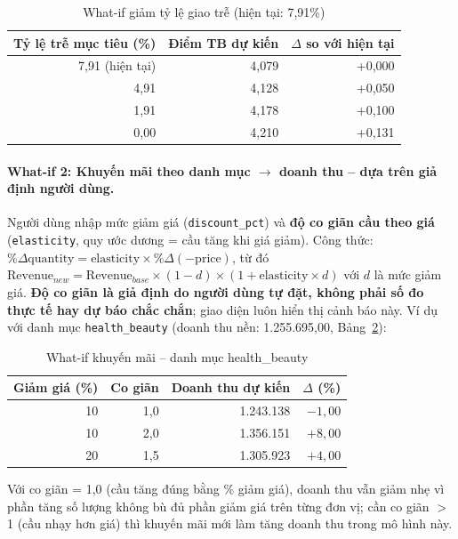 \documentclass[12pt,a4paper]{article}
\newcommand{\code}[1]{\texttt{\small #1}}
\begin{document}
\begin{table}[h]
\centering
\caption{What-if giảm tỷ lệ giao trễ (hiện tại: 7,91\%)}\label{tab:whatif-delivery}
\small
\begin{tabular}{@{}r r r@{}}
\toprule
\textbf{Tỷ lệ trễ mục tiêu (\%)} & \textbf{Điểm TB dự kiến} & \textbf{\(\Delta\) so với hiện tại}\\
\midrule
7,91 (hiện tại) & 4,079 & +0,000\\
4,91 & 4,128 & +0,050\\
1,91 & 4,178 & +0,100\\
0,00 & 4,210 & +0,131\\
\bottomrule
\end{tabular}
\end{table}

\paragraph{What-if 2: Khuyến mãi theo danh mục \(\to\) doanh thu -- dựa trên giả định người dùng.}
Người dùng nhập mức giảm giá (\code{discount\_pct}) và \textbf{độ co giãn cầu theo giá}
(\code{elasticity}, quy ước dương = cầu tăng khi giá giảm). Công thức:
\(\%\Delta\text{quantity} = \text{elasticity} \times \%\Delta(-\text{price})\), từ đó
\(\text{Revenue}_{new} = \text{Revenue}_{base} \times (1-d) \times (1 + \text{elasticity} \times d)\) với
\(d\) là mức giảm giá. \textbf{Độ co giãn là giả định do người dùng tự đặt, không phải số đo thực tế hay dự
báo chắc chắn}; giao diện luôn hiển thị cảnh báo này. Ví dụ với danh mục \code{health\_beauty}
(doanh thu nền: 1.255.695,00, Bảng~\ref{tab:whatif-promo}):

\begin{table}[h]
\centering
\caption{What-if khuyến mãi -- danh mục health\_beauty}\label{tab:whatif-promo}
\small
\begin{tabular}{@{}r r r r@{}}
\toprule
\textbf{Giảm giá (\%)} & \textbf{Co giãn} & \textbf{Doanh thu dự kiến} & \textbf{\(\Delta\) (\%)}\\
\midrule
10 & 1,0 & 1.243.138 & $-1,00$\\
10 & 2,0 & 1.356.151 & $+8,00$\\
20 & 1,5 & 1.305.923 & $+4,00$\\
\bottomrule
\end{tabular}
\end{table}

Với co giãn = 1,0 (cầu tăng đúng bằng \% giảm giá), doanh thu vẫn giảm nhẹ vì phần tăng số lượng không bù đủ
phần giảm giá trên từng đơn vị; cần co giãn \(>\) 1 (cầu nhạy hơn giá) thì khuyến mãi mới làm tăng doanh thu
trong mô hình này.
\end{document}
